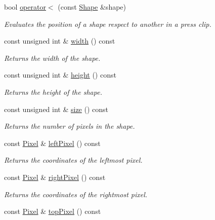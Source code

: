 \begin{CompactItemize}
bool \hyperlink{class_shape_183a6bc428172ced8122ffb68d0f04ef}{operator$<$} (const \hyperlink{class_shape}{Shape} \&shape)
\begin{CompactList}\small\item\em Evaluates the position of a shape respect to another in a press clip. \item\end{CompactList}\item 
const unsigned int \& \hyperlink{class_shape_6773dfedb96ef750e5469e22d51ecf0f}{width} () const 
\begin{CompactList}\small\item\em Returns the width of the shape. \item\end{CompactList}\item 
const unsigned int \& \hyperlink{class_shape_8400155046b2190bce621f8f366ef2be}{height} () const 
\begin{CompactList}\small\item\em Returns the height of the shape. \item\end{CompactList}\item 
const unsigned int \& \hyperlink{class_shape_8504d3be338d2fa594c35fe1444a9ed8}{size} () const 
\begin{CompactList}\small\item\em Returns the number of pixels in the shape. \item\end{CompactList}\item 
const \hyperlink{_pixel_8hpp_535e59456e3e633842529cfa8ea103c4}{Pixel} \& \hyperlink{class_shape_53d49d362234068aad0b80986fabb85d}{leftPixel} () const 
\begin{CompactList}\small\item\em Returns the coordinates of the leftmost pixel. \item\end{CompactList}\item 
const \hyperlink{_pixel_8hpp_535e59456e3e633842529cfa8ea103c4}{Pixel} \& \hyperlink{class_shape_c265e43fa90ee2ab7c9cd3a3d1e96d82}{rightPixel} () const 
\begin{CompactList}\small\item\em Returns the coordinates of the rightmost pixel. \item\end{CompactList}\item 
const \hyperlink{_pixel_8hpp_535e59456e3e633842529cfa8ea103c4}{Pixel} \& \hyperlink{class_shape_063c4934d8c1cd4b02e4e3e4a604f62e}{topPixel} () const 

\end{CompactItemize}
